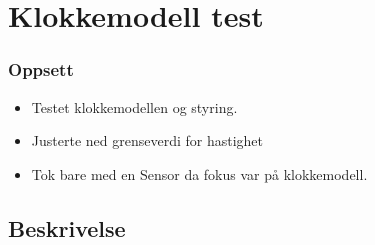 \documentclass[xcolor=table]{beamer}
\begin{document}
\section{Klokkemodell test}
\begin{frame}
\frametitle{Oppsett}
  \begin{itemize}
    \item Testet klokkemodellen og styring.
    \item Justerte ned grenseverdi for hastighet
    \item Tok bare med en Sensor da fokus var på klokkemodell.
  \end{itemize}
\end{frame}

\subsection{Beskrivelse}
\end{document}
